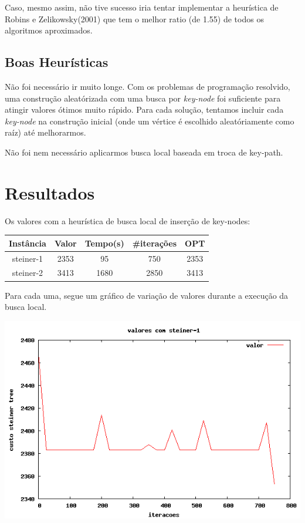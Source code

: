 \documentclass[a4paper,10pt,brazilian]{article}
\begin{document}
Caso, mesmo assim, não tive sucesso iria tentar implementar a heurística de Robins e Zelikowsky(2001) que tem o melhor ratio (de 1.55) de todos os algoritmos aproximados. 

\subsection{Boas Heurísticas}

Não foi necessário ir muito longe. Com os problemas de programação resolvido, uma construção aleatórizada com uma busca por \textit{key-node} foi suficiente para atingir valores ótimos muito rápido. Para cada solução, tentamos incluir cada \textit{key-node} na construção inicial (onde um vértice é escolhido aleatóriamente como raíz) até melhorarmos. 

Não foi nem necessário aplicarmos busca local baseada em troca de key-path.

\section{Resultados}

Os valores com a heurística de busca local de inserção de key-nodes:

\begin{tabular}{|c|c|c|c|c|}
\hline  Instância & Valor  & Tempo(s)  & \#iterações & OPT  \\ 
\hline  steiner-1 &  2353 &  95 & 750 & 2353 \\ 
\hline  steiner-2 &  3413 &  1680 & 2850 & 3413  \\ 
\hline 
\end{tabular} 

Para cada uma, segue um gráfico de variação de valores durante a execução da busca local.

\includegraphics[scale=0.5]{1graph.png} 
\end{document}
